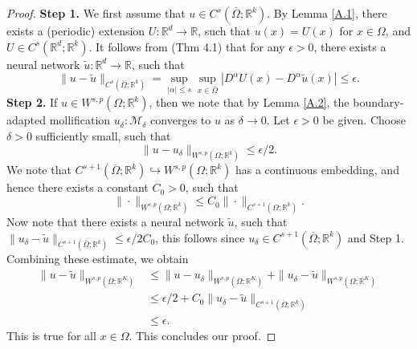\documentclass[reqno,9pt]{amsart}
\theoremstyle{plain}
\theoremstyle{definition}
\newcommand{\bb}[1]{\mathbb{#1}}
\newcommand{\cal}[1]{\mathcal{#1}}
\begin{document}
\begin{proof}
    {\bf Step 1.} We first assume that $u \in C^s(\overline{\Omega};\bb R^k)$. By Lemma \ref{A.1}, there exists a (periodic) extension $U : \bb R^d \to \bb R$, such that $u(x) = U(x)$ for $x \in \Omega$, and $U \in C^s(\bb R^d;\bb R^k)$. It follows from \cite{AP1999}(Thm 4.1) that for any $\epsilon > 0$, there exists a neural network $\tilde{u} : \bb R^d \to \bb R$, such that
    $$ \|u - \tilde{u}\|_{C^s(\overline{\Omega};\bb R^k)} = \sup_{|\alpha| \leq s}\sup_{x\in \overline{\Omega}}|D^\alpha U(x) - D^\alpha \tilde{u}(x)| \leq \epsilon.$$
    {\bf Step 2.} If $u \in W^{s,p}(\Omega;\bb R^k)$, then we note that by Lemma \ref{A.2}, the boundary-adapted mollification $u_\delta:\cal M_\delta$ converges to $u$ as $\delta \to 0$. Let $\epsilon > 0$ be given. Choose $\delta > 0$ sufficiently small, such that
    $$ \|u - u_\delta\|_{W^{s,p}(\Omega;\bb R^k)} \leq \epsilon/2.$$
    We note that $C^{s+1}(\overline{\Omega};\bb R^k) \hookrightarrow W^{s,p}(\Omega;\bb R^k)$ has a continuous embedding, and hence there exists a constant $C_0 > 0$, such that
    $$ \|\cdot\|_{W^{s,p}(\Omega;\bb R^k)} \leq C_0 \|\cdot\|_{C^{s+1}(\Omega;\bb R^k)}.$$
    Now note that there exists a neural network $\tilde{u}$, such that $\|u_\delta - \tilde{u}\|_{C^{s+1}(\overline{\Omega};\bb R^k)} \leq \epsilon/2C_0$, this follows since $u_\delta \in C^{s+1}(\overline{\Omega};\bb R^k)$ and Step 1. Combining these estimate, we obtain
    $$
    \begin{aligned}
        \|u - \tilde{u}\|_{W^{s,p}(\Omega;\bb R^K)} &\leq \|u - u_\delta\|_{W^{s,p}(\Omega;\bb R^K)} + \|u_\delta - \tilde{u}\|_{W^{s,p}(\Omega;\bb R^K)} \\
        &\leq \epsilon/2 + C_0\|u_\delta - \tilde{u}\|_{C^{s+1}(\overline{\Omega};\bb R^k)}\\
        &\leq \epsilon.
    \end{aligned}
    $$
    This is true for all $x \in \Omega$. This concludes our proof.
\end{proof}
\end{document}
